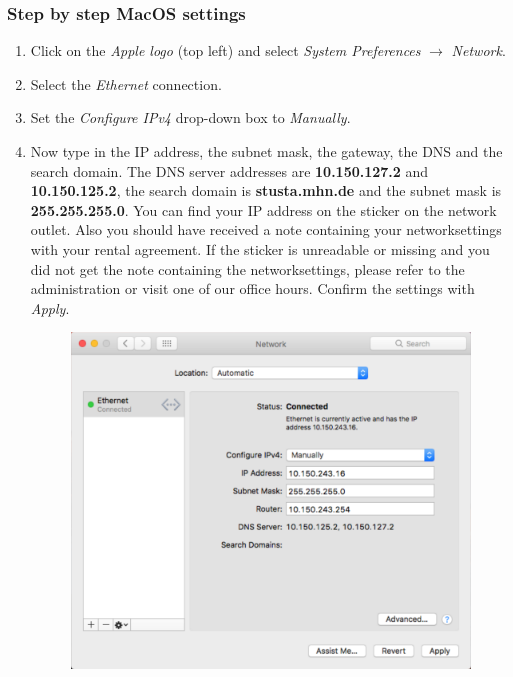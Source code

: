 \documentclass[a4paper,12pt]{scrartcl}
\begin{document}
\subsubsection*{Step by step MacOS settings}
\begin{enumerate}
	\item Click on the \emph{Apple logo} (top left) and select \emph{System Preferences} $\rightarrow$ \emph{Network}.
	\item Select the \emph{Ethernet} connection.
	\item Set the \emph{Configure IPv4} drop-down box to \emph{Manually}.
	\item Now type in the IP address, the subnet mask, the gateway, the DNS and the search domain. The DNS server addresses are \textbf{10.150.127.2} and \textbf{10.150.125.2}, the search domain is \textbf{stusta.mhn.de} and the subnet mask is \textbf{255.255.255.0}. You can find your IP address on the sticker on the network outlet. Also you should have received a note containing your networksettings with your rental agreement. If the sticker is unreadable or missing and you did not get the note containing the networksettings, please refer to the administration or visit one of our office hours. Confirm the settings with \emph{Apply}.
      \begin{figure}[h!]
      \centering
        \begin{minipage}[c]{0.60\linewidth}
          \centering
          \includegraphics[width=0.9\linewidth,keepaspectratio]{Bilder/IP_Mac_EN}
        \end{minipage}
      \vspace{-20pt}
      \end{figure}
\end{enumerate}
\end{document}
